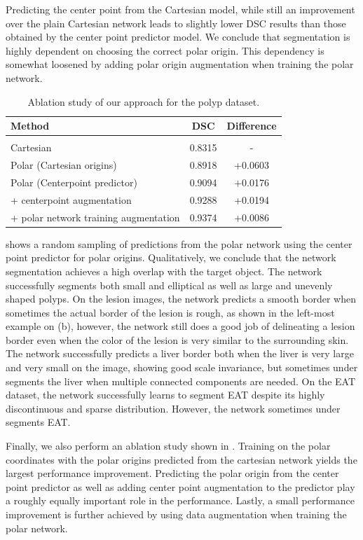 Predicting the center point from the Cartesian model, while still an improvement over the plain 
Cartesian network leads to slightly lower DSC results than those obtained by the center point predictor model. 
We conclude that segmentation is highly dependent on choosing the correct polar origin. This 
dependency is somewhat loosened by adding polar origin augmentation when training the polar 
network.

	\begin{table}[t]
\centering
\def\arraystretch{1.2}
\begin{tabularx}{\linewidth}{X c c}
 Method & DSC & Difference \\ 
 \hline \\ [-2ex]
Cartesian & 0.8315 & - \\
Polar (Cartesian origins) & 0.8918  & +0.0603 \\
Polar (Centerpoint predictor) & 0.9094 & +0.0176  \\
 + centerpoint augmentation & 0.9288 & +0.0194 \\
 + polar network training augmentation & 0.9374 & +0.0086 \\ [1ex]
\end{tabularx}
\caption{Ablation study of our approach for the polyp dataset.}
\label{table:ablation}
\end{table}

 shows a random sampling of predictions from the polar network using the center point predictor for polar origins. Qualitatively, we conclude that the network segmentation achieves a high overlap with the target object. The network successfully segments both small and elliptical as well as large and unevenly shaped polyps. On the lesion images, the network predicts a smooth border when sometimes the actual border of the lesion is rough, as shown in the left-most example on (b), however, the network still does a good job of delineating a lesion border even when the color of the lesion is very similar to the surrounding skin. The network successfully predicts a liver border both when the liver is very large and very small on the image, showing good scale invariance, but sometimes under segments the liver when multiple connected components are needed. On the EAT dataset, the network successfully learns to segment EAT despite its highly discontinuous and sparse distribution. However, the network sometimes under segments EAT.

Finally, we also perform an ablation study shown in . Training on the polar coordinates with the polar origins predicted from the cartesian network yields the largest performance improvement. Predicting the polar origin from the center point predictor as well as adding center point augmentation to the predictor play a roughly equally important role in the performance. Lastly, a small performance improvement is further achieved by using data augmentation when training the polar network.

